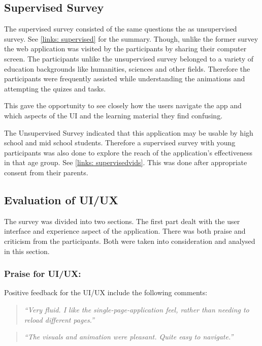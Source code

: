 \subsection{Supervised Survey}
The supervised survey consisted of the same questions the as unsupervised
survey. See \autoref{links: supervised} for the summary. Though, unlike the
former survey the web application was visited by the participants by sharing
their computer screen. The participants unlike the unsupervised survey belonged
to a variety of education backgrounds like humanities, sciences and other
fields. Therefore the participants were frequently assisted while understanding
the animations and attempting the quizes and tasks.

This gave the opportunity to see closely how the users navigate the app and
which aspects of the UI and the learning material they find confusing.

The Unsupervised Survey indicated that this application may be usable by high
school and mid school students. Therefore a supervised survey with young
participants was also done to explore the reach of the application's
effectiveness in that age group. See \autoref{links: supervisedvids}. This was
done after appropriate consent from their parents.


\subsection{Evaluation of UI/UX}
The survey was divided into two sections. The first part dealt with the user interface
and experience aspect of the application. There was both praise and criticism
from the participants. Both were taken into consideration and analysed
in this section.

\subsubsection{Praise for UI/UX:}
Positive feedback for the UI/UX include the following comments:

\begin{quote}
\emph{``Very fluid. I like the single-page-application feel, rather than
needing to reload different pages.''}
\end{quote}

\vspace{0.06 in}
\begin{quote}
\emph{``The visuals and animation were pleasant. Quite easy to navigate.''}
\end{quote}

